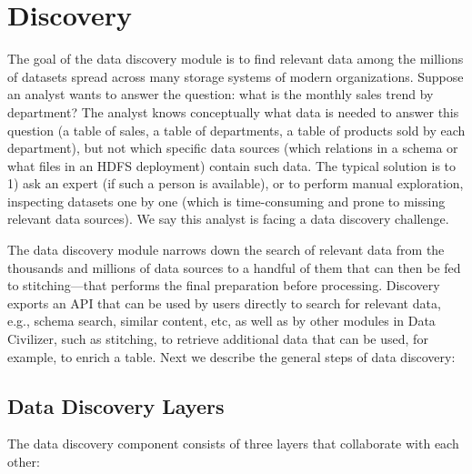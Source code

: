 \section{Discovery}
\label{sec:discovery}

The goal of the data discovery module is to find relevant data among the
millions of datasets spread across many storage systems of modern organizations.
Suppose an analyst wants to answer the question: what is the monthly sales trend
by department? The analyst knows conceptually what data is needed to answer this
question (a table of sales, a table of departments, a table of products sold by
each department), but not which specific data sources (which relations in a
schema or what files in an HDFS deployment) contain such data. The typical
solution is to 1) ask an expert (if such a person is available), or to perform
manual exploration, inspecting datasets one by one (which is time-consuming and
prone to missing relevant data sources). We say this analyst is facing a data
discovery challenge.

The data discovery module narrows down the search of relevant data from the
thousands and millions of data sources to a handful of them that can then be fed
to stitching---that performs the final preparation before processing. Discovery
exports an API that can be used by users directly to search for relevant data,
e.g., schema search, similar content, etc, as well as by other modules in Data
Civilizer, such as stitching, to retrieve additional data that can be used, for
example, to enrich a table. Next we describe the general steps of data
discovery:

\subsection{Data Discovery Layers}


The data discovery component consists of three layers that collaborate with each other:

